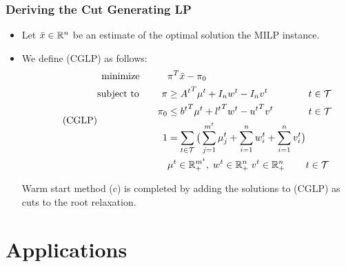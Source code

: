 \documentclass{beamer}
\begin{document}
	\begin{frame}[t]
		\frametitle{Deriving the Cut Generating LP}
		\small
		\vspace{-.25cm}
		\begin{itemize}
			\begin{block}{}
				We can generate a cut valid for all terminal subproblems that maximally violates a solution estimate by solving the CGLP.
			\end{block}
			\item Let $ \bar{x} \in \mathbb{R}^n $ be an estimate of the optimal solution the MILP instance.
			\item We define (CGLP) as follows:
			\begin{equation} \tag{CGLP}
				\begin{alignedat}{2} \label{e:cglp} 
					\text{minimize } \; \; \qquad & \pi^T \bar{x} - \pi_0 && \\
					\text{subject to } \qquad \pi & \geq {A^{t}}^T \mu^{t} + I_n w^{t} - I_n v^{t} && \;  t \in \mathcal{T} \\
					\pi_0 & \leq {b^{t}}^T \mu^{t} + {l^{t}}^T w^{t} - {u^{t}}^T v^{t} && \; t \in \mathcal{T} \\
					1 & = \sum_{t \in \mathcal{T}} \big( \sum_{j=1}^{m^t} \mu_j^{t} + \sum_{i=1}^{n} w_i^{t} + \sum_{i=1}^{n} v_i^{t} \big) && \\
					& \mu^{t} \in \mathbb{R}_+^{m^t}, \; w^{t} \in \mathbb{R}_+^n \; v^{t} \in \mathbb{R}_+^n && t \in \mathcal{T}
				\end{alignedat}
			\end{equation}
			\vspace{-.25cm}
			\begin{block}{}
				Warm start method (c) is completed by adding the solutions to (CGLP) as cuts to the root relaxation.
			\end{block}
		\end{itemize}
		\normalsize
	\end{frame}

	\section{Applications}
	
\end{document}

